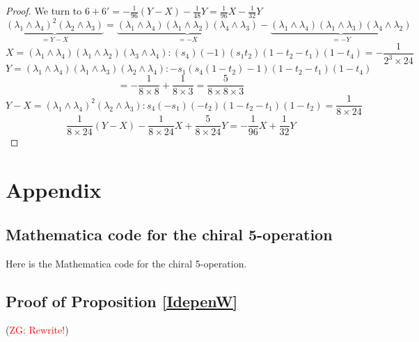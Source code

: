 \documentclass[11pt]{amsart}
\theoremstyle{definition}
\theoremstyle{remark}
\numberwithin{equation}{section}
\newcommand{\Gui}[1]{(\textcolor{red}{ZG: #1})}
\begin{document}
\begin{proof}
We turn to $\boxed{6}+\boxed{6'}=-\frac{1}{96}(Y-X)-\frac{1}{48}Y=\frac{1}{96}X-\frac{1}{32}Y$
$$
\underbrace{\left(\lambda_1 \wedge \lambda_4\right)^2\left(\lambda_2 \wedge \lambda_3\right)}_{=Y-X}=\underbrace{\left(\lambda_1 \wedge \lambda_4\right)\left(\lambda_1 \wedge \lambda_2\right)\left(\lambda_4 \wedge \lambda_3\right)}_{=-X}-\underbrace{\left(\lambda_1 \wedge \lambda_4\right)\left(\lambda_1 \wedge \lambda_3\right)\left(\lambda_4 \wedge \lambda_2\right)}_{=-Y}
$$
$$
X=\left(\lambda_1 \wedge \lambda_4\right)\left(\lambda_1 \wedge \lambda_2\right)\left(\lambda_3 \wedge \lambda_4\right):(s_4)(-1)(s_1t_2)(1-t_2-t_1)(1-t_4)=-\frac{1}{2^3\times 24}
$$
$$
Y=\left(\lambda_1 \wedge \lambda_4\right)\left(\lambda_1 \wedge \lambda_3\right)\left(\lambda_2 \wedge \lambda_4\right):-s_1(s_4(1-t_2)-1)(1-t_2-t_1)(1-t_4)
$$
$$
=-\frac{1}{8\times 8}+\frac{1}{8\times 3}=\frac{5}{8\times 8\times 3}
$$
$$
Y-X=\left(\lambda_1 \wedge \lambda_4\right)^2\left(\lambda_2 \wedge \lambda_3\right):s_4(-s_1)(-t_2)(1-t_2-t_1)(1-t_2)=\frac{1}{8\times 24}
$$
$$
\frac{1}{8\times 24}(Y-X)-\frac{1}{8\times 24}X+\frac{5}{8\times 24}Y=-\frac{1}{96}X+\frac{1}{32}Y
$$

\end{proof}
\fi
\fi
\section{Appendix}

\subsection{Mathematica code for the chiral 5-operation}
Here is the Mathematica code for the chiral 5-operation.
\iffalse
\subsection{Proof of Proposition \ref{IdepenW}}\label{ProofIdepenW}
\Gui{Rewrite!}
\end{document}
